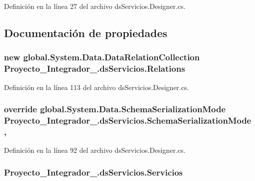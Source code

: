 Definición en la línea 27 del archivo ds\-Servicios.\-Designer.\-cs.



\subsection{Documentación de propiedades}
\hypertarget{class_proyecto___integrador__3_1_1ds_servicios_a4a938f593d4405efc7c790a3b3a5b9d7}{
\subsubsection[{Relations}]{\setlength{\rightskip}{0pt plus 5cm}new global.\-System.\-Data.\-Data\-Relation\-Collection Proyecto\-\_\-\-Integrador\-\_.\-ds\-Servicios.\-Relations\hspace{0.3cm}{\ttfamily [get]}}}\label{class_proyecto___integrador__3_1_1ds_servicios_a4a938f593d4405efc7c790a3b3a5b9d7}


Definición en la línea 113 del archivo ds\-Servicios.\-Designer.\-cs.

\hypertarget{class_proyecto___integrador__3_1_1ds_servicios_a062b8dfa3dfcc4aa92a8bf2d69194589}{
\subsubsection[{Schema\-Serialization\-Mode}]{\setlength{\rightskip}{0pt plus 5cm}override global.\-System.\-Data.\-Schema\-Serialization\-Mode Proyecto\-\_\-\-Integrador\-\_.\-ds\-Servicios.\-Schema\-Serialization\-Mode\hspace{0.3cm}{\ttfamily [get]}, {\ttfamily [set]}}}\label{class_proyecto___integrador__3_1_1ds_servicios_a062b8dfa3dfcc4aa92a8bf2d69194589}


Definición en la línea 92 del archivo ds\-Servicios.\-Designer.\-cs.

\hypertarget{class_proyecto___integrador__3_1_1ds_servicios_a03c1b1284ccc9c2b139d6102da34f6e9}{
\subsubsection[{Servicios}]{ Proyecto\-\_\-\-Integrador\-\_.\-ds\-Servicios.\-Servicios\hspace{0.3cm}{\ttfamily [get]}}}\label{class_proyecto___integrador__3_1_1ds_servicios_a03c1b1284ccc9c2b139d6102da34f6e9}


